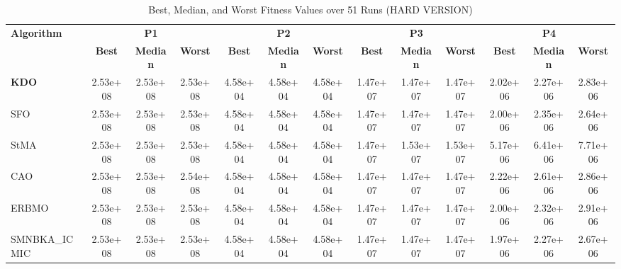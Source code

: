 \begin{table}
\centering
\caption{Best, Median, and Worst Fitness Values over 51 Runs (HARD VERSION)}
\label{tab:best_median_worst}
\tiny
\setlength{\tabcolsep}{2pt}
\begin{tabular}{lcccccccccccc}
\toprule
\multirow{2}{*}{\textbf{Algorithm}} & \multicolumn{3}{c}{\textbf{P1}} & \multicolumn{3}{c}{\textbf{P2}} & \multicolumn{3}{c}{\textbf{P3}} & \multicolumn{3}{c}{\textbf{P4}} \\
\cmidrule(lr){2-4}\cmidrule(lr){5-7}\cmidrule(lr){8-10}\cmidrule(lr){11-13}
 & \textbf{Best} & \textbf{Median} & \textbf{Worst} & \textbf{Best} & \textbf{Median} & \textbf{Worst} & \textbf{Best} & \textbf{Median} & \textbf{Worst} & \textbf{Best} & \textbf{Median} & \textbf{Worst} \\
\midrule
\textbf{KDO} & 2.53e+08 & 2.53e+08 & 2.53e+08 & 4.58e+04 & 4.58e+04 & 4.58e+04 & 1.47e+07 & 1.47e+07 & 1.47e+07 & 2.02e+06 & 2.27e+06 & 2.83e+06 \\
SFO & 2.53e+08 & 2.53e+08 & 2.53e+08 & 4.58e+04 & 4.58e+04 & 4.58e+04 & 1.47e+07 & 1.47e+07 & 1.47e+07 & 2.00e+06 & 2.35e+06 & 2.64e+06 \\
StMA & 2.53e+08 & 2.53e+08 & 2.53e+08 & 4.58e+04 & 4.58e+04 & 4.58e+04 & 1.47e+07 & 1.53e+07 & 1.53e+07 & 5.17e+06 & 6.41e+06 & 7.71e+06 \\
CAO & 2.53e+08 & 2.53e+08 & 2.54e+08 & 4.58e+04 & 4.58e+04 & 4.58e+04 & 1.47e+07 & 1.47e+07 & 1.47e+07 & 2.22e+06 & 2.61e+06 & 2.86e+06 \\
ERBMO & 2.53e+08 & 2.53e+08 & 2.53e+08 & 4.58e+04 & 4.58e+04 & 4.58e+04 & 1.47e+07 & 1.47e+07 & 1.47e+07 & 2.00e+06 & 2.32e+06 & 2.91e+06 \\
SMNBKA_ICMIC & 2.53e+08 & 2.53e+08 & 2.53e+08 & 4.58e+04 & 4.58e+04 & 4.58e+04 & 1.47e+07 & 1.47e+07 & 1.47e+07 & 1.97e+06 & 2.27e+06 & 2.67e+06 \\
\bottomrule
\end{tabular}
\end{table}
